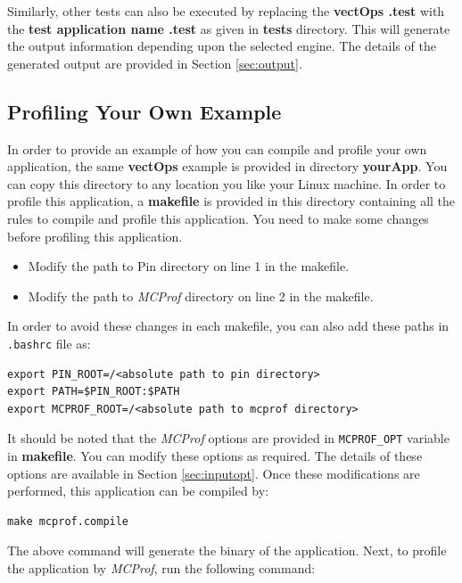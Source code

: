 \documentclass[10pt]{article}
\newcommand{\MCPROF}{\emph{MCProf}}
\begin{document}
Similarly, other tests can also be executed by replacing the
\textbf{\textlangle vectOps \textrangle.test} with the
\textbf{\textlangle test application name \textrangle.test} as
given in \textbf{tests} directory. This will generate the output information
depending upon the selected engine. The details of the generated output are
provided in Section \ref{sec:output}.

\subsection{Profiling Your Own Example}

In order to provide an example of how you can compile and profile your own
application, the same \textbf{vectOps} example is provided in directory
\textbf{yourApp}. You can copy this directory to any location you like your
Linux machine. In order to profile this application, a \textbf{makefile} is
provided in this directory containing all the rules to compile and profile this
application. You need to make some changes before profiling this application.

\begin{itemize}
\item Modify the path to Pin directory on line 1 in the makefile.
\item Modify the path to \MCPROF{} directory on line 2 in the makefile.
\end{itemize}

In order to avoid these changes in each makefile, you can also add these paths
in \verb|.bashrc| file as:

{
\small
\begin{Verbatim}[frame=single]
export PIN_ROOT=/<absolute path to pin directory>
export PATH=$PIN_ROOT:$PATH
export MCPROF_ROOT=/<absolute path to mcprof directory>
\end{Verbatim}
}

It should be noted that the \MCPROF{} options are provided in \verb|MCPROF_OPT|
variable in \textbf{makefile}. You can modify these options as required. The
details of these options are available in Section \ref{sec:inputopt}. Once these
modifications are performed, this application can be compiled by:

{
\small
\begin{Verbatim}[frame=single]
make mcprof.compile
\end{Verbatim}
}

The above command will generate the binary of the application. Next, to profile
the application by \MCPROF{}, run the following command:
\end{document}
